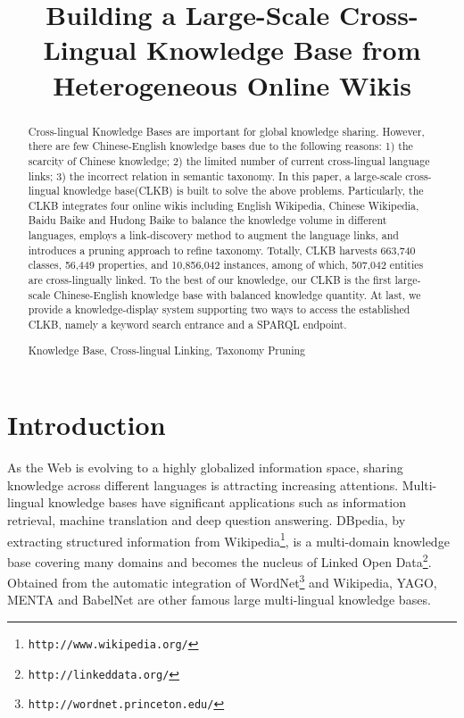 \documentclass[runningheads,a4paper]{llncs}
\newcommand{\keywords}[1]{\par\addvspace\baselineskip\noindent\keywordname\enspace\ignorespaces#1}
\begin{document}
\mainmatter

\title{Building a Large-Scale Cross-Lingual Knowledge Base from Heterogeneous Online Wikis}


\maketitle

\begin{abstract}
Cross-lingual Knowledge Bases are important for global knowledge sharing. However, there are few Chinese-English knowledge bases due to the following reasons: 1) the scarcity of Chinese knowledge; 2) the limited number of current cross-lingual language links; 3) the incorrect relation in semantic taxonomy. In this paper, a large-scale cross-lingual knowledge base(CLKB) is built to solve the above problems. Particularly, the CLKB integrates four online wikis including English Wikipedia, Chinese Wikipedia, Baidu Baike and Hudong Baike to balance the knowledge volume in different languages, employs a link-discovery method to augment the language links, and introduces a pruning approach to refine taxonomy. Totally, CLKB harvests 663,740 classes, 56,449 properties, and 10,856,042 instances, among of which, 507,042 entities are cross-lingually linked. To the best of our knowledge, our CLKB is the first large-scale Chinese-English knowledge base with balanced knowledge quantity. At last, we provide a knowledge-display system supporting two ways to access the established CLKB, namely a keyword search entrance and a SPARQL endpoint. 

\keywords{Knowledge Base, Cross-lingual Linking, Taxonomy Pruning}
\end{abstract}

\section{Introduction}
As the Web is evolving to a highly globalized information space, sharing knowledge across different languages is attracting increasing attentions. Multi-lingual knowledge bases have significant applications such as information retrieval, machine translation and deep question answering. DBpedia, by extracting structured information from Wikipedia\footnote{{\tt http://www.wikipedia.org/}}, is a multi-domain knowledge base covering many domains and becomes the nucleus of Linked Open Data\footnote{{\tt http://linkeddata.org/}}. Obtained from the automatic integration of WordNet\footnote{{\tt http://wordnet.princeton.edu/}} and Wikipedia, YAGO, MENTA and BabelNet are other famous large multi-lingual knowledge bases.
\end{document}
